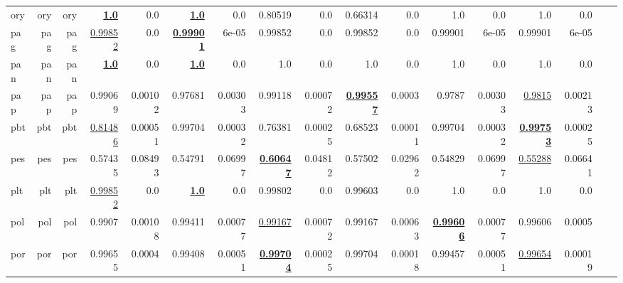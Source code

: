 \documentclass[11pt]{article}
\begin{document}
\begin{table*}[h]
{\begin{tabular}{lrrrrrrrrrrrrrrrr}
ory         & ory         & ory         & \textbf{\underline{1.0}}         & 0.0         & \textbf{\underline{1.0}}         & 0.0         & 0.80519         & 0.0         & 0.66314         & 0.0         & 1.0         & 0.0         & 1.0         & 0.0         \\
pag         & pag         & pag         & \underline{0.99852}         & 0.0         & \textbf{\underline{0.99901}}         & 6e-05         & 0.99852         & 0.0         & 0.99852         & 0.0         & 0.99901         & 6e-05         & 0.99901         & 6e-05         \\
pan         & pan         & pan         & \textbf{\underline{1.0}}         & 0.0         & \textbf{\underline{1.0}}         & 0.0         & 1.0         & 0.0         & 1.0         & 0.0         & 1.0         & 0.0         & 1.0         & 0.0         \\
pap         & pap         & pap         & 0.99069         & 0.00102         & 0.97681         & 0.00303         & 0.99118         & 0.00072         & \textbf{\underline{0.99557}}         & 0.0003         & 0.9787         & 0.00303         & \underline{0.9815}         & 0.00213         \\
pbt         & pbt         & pbt         & \underline{0.81486}         & 0.00051         & 0.99704         & 0.00032         & 0.76381         & 0.00025         & 0.68523         & 0.00011         & 0.99704         & 0.00032         & \textbf{\underline{0.99753}}         & 0.00025         \\
pes         & pes         & pes         & 0.57435         & 0.08493         & 0.54791         & 0.06997         & \textbf{\underline{0.60647}}         & 0.04812         & 0.57502         & 0.02962         & 0.54829         & 0.06997         & \underline{0.55288}         & 0.06641         \\
plt         & plt         & plt         & \underline{0.99852}         & 0.0         & \textbf{\underline{1.0}}         & 0.0         & 0.99802         & 0.0         & 0.99603         & 0.0         & 1.0         & 0.0         & 1.0         & 0.0         \\
pol         & pol         & pol         & 0.9907         & 0.00108         & 0.99411         & 0.00077         & \underline{0.99167}         & 0.00072         & 0.99167         & 0.00063         & \textbf{\underline{0.99606}}         & 0.00077         & 0.99606         & 0.0005         \\
por         & por         & por         & 0.99655         & 0.0004         & 0.99408         & 0.00051         & \textbf{\underline{0.99704}}         & 0.00025         & 0.99704         & 0.00018         & 0.99457         & 0.00051         & \underline{0.99654}         & 0.00019         \\

\end{tabular}}
\end{table*}
\end{document}
